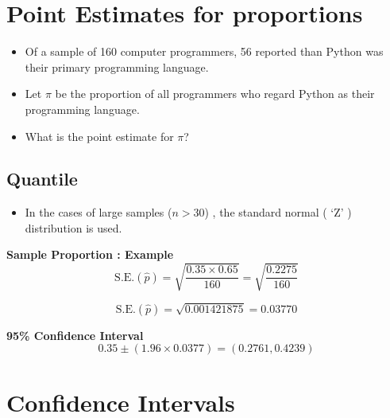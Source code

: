 \documentclass[a4paper,12pt]{article}
\begin{document}


\section*{Point Estimates for proportions }

\begin{itemize}
\item Of a sample of 160 computer programmers, 56 reported than Python was their primary programming language.
\item Let $\pi$ be the proportion of all programmers who regard Python as their programming language. 
\item What is the point estimate for $\pi$?
\end{itemize}





\subsection*{Quantile}
\begin{itemize}
\item In the cases of large samples ($ n > 30$) , the standard normal ( `Z' ) distribution is used.

\end{itemize}


\textbf{ Sample Proportion : Example}
\[ \mbox{S.E.}(\hat{p}) =  \sqrt{\frac{0.35 \times 0.65}{160}} = \sqrt{\frac{0.2275}{160}}\]

\[ \mbox{S.E.}(\hat{p}) = \sqrt{0.001421875} = 0.03770\]

\textbf{95\% Confidence Interval}
\[0.35 \pm (1.96 \times 0.0377) = (0.2761, 0.4239)\]



\section{Confidence Intervals}
\end{document}
